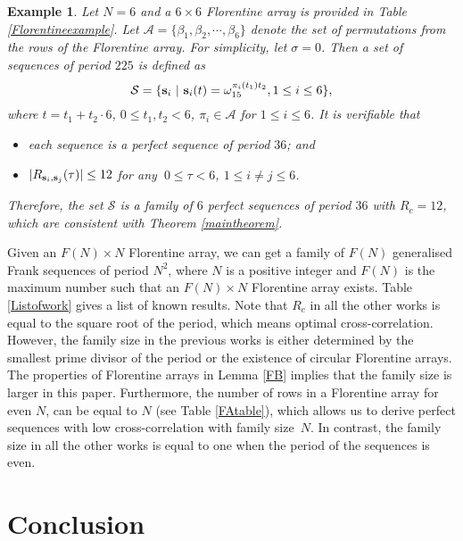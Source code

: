\documentclass[conference,letterpaper]{IEEEtran}
\newtheorem{Example}{Example}
\theoremstyle{definition}
\begin{document}
 \begin{Example}
Let $N=6$ and  a $6 \times 6$  Florentine array is provided in Table \ref{Florentineexample}. Let  $\mathcal{A} =\{\beta_{1}, \beta_{2}, \cdots, \beta_{6}\}$ denote the set of permutations from the rows of the  Florentine array. For simplicity, let $\sigma =0$. Then a set of sequences of period $225$ is defined as
\begin{equation*} 
\mathcal{S} = \{  {\bf s}_{i} ~\vert~ {\bf s}_{i}(t) = \omega_{15}^{ \pi_i(t_{1}) t_{2} }, 1 \leq i \leq 6\},
\end{equation*}
 where $t=t_{1}+t_{2}\cdot 6$, $0 \leq t_{1}, t_{2}  < 6$, $\pi_i \in \mathcal{A}$ for $1 \leq i \leq 6$.
It is  verifiable that
\begin{itemize}
\item each sequence is a perfect sequence of period $36$;
and
\item $\vert R_{{\bf s}_{i},{\bf s}_{j}}(\tau) \vert \leq 12 $ for any  $~0\leq \tau< 6$,
 $1\leq i \neq j \leq 6$.
\end{itemize}
Therefore, the set $\mathcal{S}$ is a family of $6$ perfect sequences of period $36$ with $R_{c} = 12$, which are consistent with Theorem \ref{maintheorem}.
\end{Example}
  
Given an $F(N) \times N$  Florentine array, we can get a family of  $F(N)$  generalised Frank sequences of period $N^2$, where $N$ is a positive integer and $F(N)$ is the maximum number such that an $F(N) \times N$  Florentine array exists. Table \ref{Listofwork} gives a list of known results. Note that  $R_{c}$ in all the other works  is equal to the square root of the period, which means optimal cross-correlation. However, the family size in the previous works is either determined by the smallest prime divisor of the period or the existence of circular Florentine arrays. The properties of Florentine arrays in Lemma \ref{FB} implies  that the family size is larger in this paper. Furthermore, the number of rows  in a Florentine array for even  $N$, can be equal to $N$ (see Table \ref{FAtable}), which allows us to derive perfect sequences with low cross-correlation with family size~$N$.
In contrast,  the family size in all the other works is equal to one when the period of the sequences is even. 




\section{Conclusion}
\end{document}
